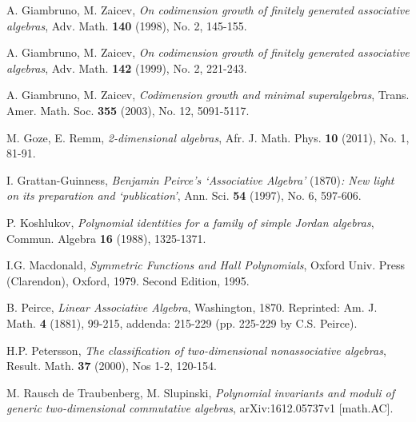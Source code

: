 \documentclass{amsart}[12pt]
\theoremstyle{definition}
\begin{document}
\begin{thebibliography}{99}
A. Giambruno, M. Zaicev,
{\it On codimension growth of finitely generated associative algebras},
Adv. Math. {\bf 140} (1998), No. 2, 145-155.

A. Giambruno, M. Zaicev,
{\it On codimension growth of finitely generated associative algebras},
Adv. Math. {\bf 142} (1999), No. 2, 221-243.

A. Giambruno, M. Zaicev,
{\it Codimension growth and minimal superalgebras},
Trans. Amer. Math. Soc. {\bf 355} (2003), No. 12, 5091-5117.

M. Goze, E. Remm,
{\it 2-dimensional algebras},
Afr. J. Math. Phys. {\bf 10} (2011), No. 1, 81-91.

I. Grattan-Guinness,
{\it Benjamin Peirce's `Associative Algebra'} (1870){\it : New light on its preparation and `publication'},
Ann. Sci. {\bf 54} (1997), No. 6, 597-606.

P. Koshlukov,
{\it Polynomial identities for a family of simple Jordan algebras},
Commun. Algebra {\bf 16} (1988), 1325-1371.

I.G. Macdonald,
{\it Symmetric Functions and Hall Polynomials},
Oxford Univ. Press (Clarendon), Oxford, 1979. Second Edition, 1995.

B. Peirce,
{\it Linear Associative Algebra}, Washington, 1870.
Reprinted: Am. J. Math. {\bf 4} (1881), 99-215, addenda: 215-229 (pp. 225-229 by C.S. Peirce).

H.P. Petersson,
{\it The classification of two-dimensional nonassociative algebras},
Result. Math. {\bf 37} (2000), Nos 1-2, 120-154.

M. Rausch de Traubenberg, M. Slupinski,
{\it Polynomial invariants and moduli of generic two-dimensional commutative algebras},
arXiv:1612.05737v1 [math.AC].

\end{thebibliography}
\end{document}
